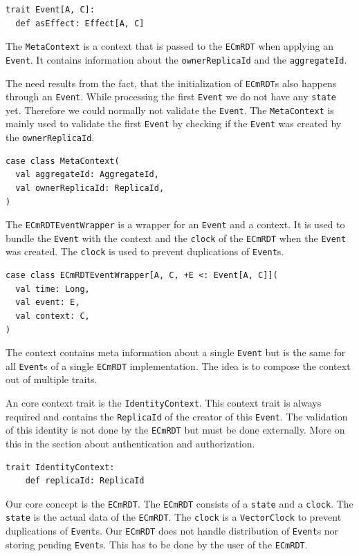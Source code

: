 \documentclass[
	ngerman,
	ruledheaders=section,   %
	class=report,		    %
	thesis={type=bachelor}, %
	accentcolor=9c,			%
	custommargins=false,    %
	marginpar=false,        %
	parskip=half-,          %
	fontsize=11pt,          %
]{tudapub}
\let\code\texttt
\begin{document}
\begin{lstlisting}
trait Event[A, C]:
  def asEffect: Effect[A, C]
\end{lstlisting}

The \code{MetaContext} is a context that is passed to the \code{ECmRDT} when applying an \code{Event}. It contains information about the \code{ownerReplicaId} and the \code{aggregateId}. 

The need results from the fact, that the initialization of \code{ECmRDT}s also happens through an \code{Event}. While processing the first \code{Event} we do not have any \code{state} yet. Therefore we could normally not validate the \code{Event}. The \code{MetaContext} is mainly used to validate the first \code{Event} by checking if the \code{Event} was created by the \code{ownerReplicaId}.

\begin{lstlisting}
case class MetaContext(
  val aggregateId: AggregateId,
  val ownerReplicaId: ReplicaId,
)
\end{lstlisting}

The \code{ECmRDTEventWrapper} is a wrapper for an \code{Event} and a context. It is used to bundle the \code{Event} with the context and the \code{clock} of the \code{ECmRDT} when the \code{Event} was created. The \code{clock} is used to prevent duplications of \code{Event}s.

\begin{lstlisting}
case class ECmRDTEventWrapper[A, C, +E <: Event[A, C]](
  val time: Long,
  val event: E,
  val context: C,
)
\end{lstlisting}

The context contains meta information about a single \code{Event} but is the same for all \code{Event}s of a single \code{ECmRDT} implementation. The idea is to compose the context out of multiple traits.

An core context trait is the \code{IdentityContext}. This context trait is always required and contains the \code{ReplicaId} of the creator of this \code{Event}. The validation of this identity is not done by the \code{ECmRDT} but must be done externally. More on this in the section about authentication and authorization.

\begin{lstlisting}
trait IdentityContext:
	def replicaId: ReplicaId
\end{lstlisting}

Our core concept is the \code{ECmRDT}. The \code{ECmRDT} consists of a \code{state} and a \code{clock}. The \code{state} is the actual data of the \code{ECmRDT}. The \code{clock} is a \code{VectorClock} to prevent duplications of \code{Event}s. Our \code{ECmRDT} does not handle distribution of \code{Event}s nor storing pending \code{Event}s. This has to be done by the user of the \code{ECmRDT}.
\end{document}
